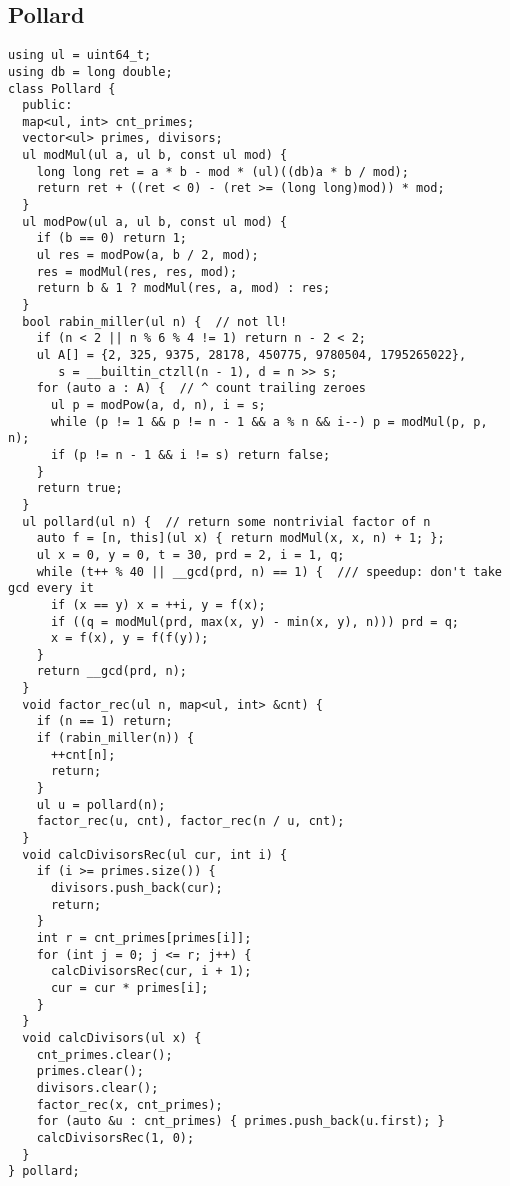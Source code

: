 \documentclass[twoside]{article}
\begin{document}
\begin{multicols*}{2}
{\subsection*{Pollard}
}
\begin{verbatim}
using ul = uint64_t;
using db = long double;
class Pollard {
  public:
  map<ul, int> cnt_primes;
  vector<ul> primes, divisors;
  ul modMul(ul a, ul b, const ul mod) {
    long long ret = a * b - mod * (ul)((db)a * b / mod);
    return ret + ((ret < 0) - (ret >= (long long)mod)) * mod;
  }
  ul modPow(ul a, ul b, const ul mod) {
    if (b == 0) return 1;
    ul res = modPow(a, b / 2, mod);
    res = modMul(res, res, mod);
    return b & 1 ? modMul(res, a, mod) : res;
  }
  bool rabin_miller(ul n) {  // not ll!
    if (n < 2 || n % 6 % 4 != 1) return n - 2 < 2;
    ul A[] = {2, 325, 9375, 28178, 450775, 9780504, 1795265022},
       s = __builtin_ctzll(n - 1), d = n >> s;
    for (auto a : A) {  // ^ count trailing zeroes
      ul p = modPow(a, d, n), i = s;
      while (p != 1 && p != n - 1 && a % n && i--) p = modMul(p, p, n);
      if (p != n - 1 && i != s) return false;
    }
    return true;
  }
  ul pollard(ul n) {  // return some nontrivial factor of n
    auto f = [n, this](ul x) { return modMul(x, x, n) + 1; };
    ul x = 0, y = 0, t = 30, prd = 2, i = 1, q;
    while (t++ % 40 || __gcd(prd, n) == 1) {  /// speedup: don't take gcd every it
      if (x == y) x = ++i, y = f(x);
      if ((q = modMul(prd, max(x, y) - min(x, y), n))) prd = q;
      x = f(x), y = f(f(y));
    }
    return __gcd(prd, n);
  }
  void factor_rec(ul n, map<ul, int> &cnt) {
    if (n == 1) return;
    if (rabin_miller(n)) {
      ++cnt[n];
      return;
    }
    ul u = pollard(n);
    factor_rec(u, cnt), factor_rec(n / u, cnt);
  }
  void calcDivisorsRec(ul cur, int i) {
    if (i >= primes.size()) {
      divisors.push_back(cur);
      return;
    }
    int r = cnt_primes[primes[i]];
    for (int j = 0; j <= r; j++) {
      calcDivisorsRec(cur, i + 1);
      cur = cur * primes[i];
    }
  }
  void calcDivisors(ul x) {
    cnt_primes.clear();
    primes.clear();
    divisors.clear();
    factor_rec(x, cnt_primes);
    for (auto &u : cnt_primes) { primes.push_back(u.first); }
    calcDivisorsRec(1, 0);
  }
} pollard;
\end{verbatim}

{
}
\end{multicols*}
\end{document}

